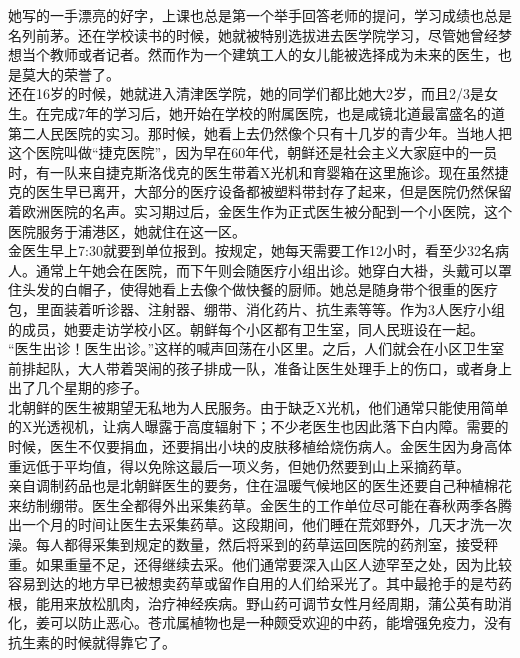 \begin{multicols}{\theparacolNo}
她写的一手漂亮的好字，上课也总是第一个举手回答老师的提问，学习成绩也总是名列前茅。还在学校读书的时候，她就被特别选拔进去医学院学习，尽管她曾经梦想当个教师或者记者。然而作为一个建筑工人的女儿能被选择成为未来的医生，也是莫大的荣誉了。\\

还在16岁的时候，她就进入清津医学院，她的同学们都比她大2岁，而且2/3是女生。在完成7年的学习后，她开始在学校的附属医院，也是咸镜北道最富盛名的道第二人民医院的实习。那时候，她看上去仍然像个只有十几岁的青少年。当地人把这个医院叫做“捷克医院”，因为早在60年代，朝鲜还是社会主义大家庭中的一员时，有一队来自捷克斯洛伐克的医生带着X光机和育婴箱在这里施诊。现在虽然捷克的医生早已离开，大部分的医疗设备都被塑料带封存了起来，但是医院仍然保留着欧洲医院的名声。实习期过后，金医生作为正式医生被分配到一个小医院，这个医院服务于浦港区，她就住在这一区。\\

金医生早上7:30就要到单位报到。按规定，她每天需要工作12小时，看至少32名病人。通常上午她会在医院，而下午则会随医疗小组出诊。她穿白大褂，头戴可以罩住头发的白帽子，使得她看上去像个做快餐的厨师。她总是随身带个很重的医疗包，里面装着听诊器、注射器、绷带、消化药片、抗生素等等。作为3人医疗小组的成员，她要走访学校小区。朝鲜每个小区都有卫生室，同人民班设在一起。\\

“医生出诊！医生出诊。”这样的喊声回荡在小区里。之后，人们就会在小区卫生室前排起队，大人带着哭闹的孩子排成一队，准备让医生处理手上的伤口，或者身上出了几个星期的疹子。\\

北朝鲜的医生被期望无私地为人民服务。由于缺乏X光机，他们通常只能使用简单的X光透视机，让病人曝露于高度辐射下；不少老医生也因此落下白内障。需要的时候，医生不仅要捐血，还要捐出小块的皮肤移植给烧伤病人。金医生因为身高体重远低于平均值，得以免除这最后一项义务，但她仍然要到山上采摘药草。\\

亲自调制药品也是北朝鲜医生的要务，住在温暖气候地区的医生还要自己种植棉花来纺制绷带。医生全都得外出采集药草。金医生的工作单位尽可能在春秋两季各腾出一个月的时间让医生去采集药草。这段期间，他们睡在荒郊野外，几天才洗一次澡。每人都得采集到规定的数量，然后将采到的药草运回医院的药剂室，接受秤重。如果重量不足，还得继续去采。他们通常要深入山区人迹罕至之处，因为比较容易到达的地方早已被想卖药草或留作自用的人们给采光了。其中最抢手的是芍药根，能用来放松肌肉，治疗神经疾病。野山药可调节女性月经周期，蒲公英有助消化，姜可以防止恶心。苍朮属植物也是一种颇受欢迎的中药，能增强免疫力，没有抗生素的时候就得靠它了。\\


\end{multicols}

